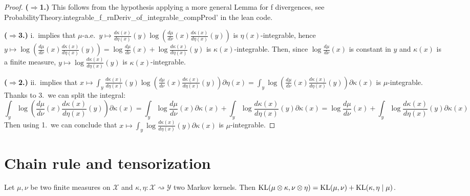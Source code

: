 \begin{proof}
{\bfseries($\Rightarrow$1.)} This follows from the hypothesis applying a more general Lemma for f divergences, see ProbabilityTheory.integrable\_f\_rnDeriv\_of\_integrable\_compProd' in the lean code.

{\bfseries($\Rightarrow$3.)} i.\ implies that $\mu$-a.e.\ $y \mapsto \frac{d \kappa(x)}{d \eta(x)}(y) \log \left(\frac{d \mu}{d \nu}(x) \frac{d \kappa(x)}{d \eta(x)}(y) \right)$ is $\eta(x)$-integrable, hence $y \mapsto \log \left(\frac{d \mu}{d \nu}(x) \frac{d \kappa(x)}{d \eta(x)}(y) \right) = \log \frac{d \mu}{d \nu}(x) + \log \frac{d \kappa(x)}{d \eta(x)}(y)$ is $\kappa(x)$-integrable. Then, since $\log \frac{d \mu}{d \nu}(x)$ is constant in $y$ and $\kappa(x)$ is a finite measure, $y \mapsto \log \frac{d \kappa(x)}{d \eta(x)}(y)$ is $\kappa(x)$-integrable.

{\bfseries($\Rightarrow$2.)} ii.\ implies that $x \mapsto  \int_y \frac{d \kappa(x)}{d \eta(x)}(y) \log \left(\frac{d \mu}{d \nu}(x) \frac{d \kappa(x)}{d \eta(x)}(y) \right) \partial \eta (x) = \int_y \log \left(\frac{d \mu}{d \nu}(x) \frac{d \kappa(x)}{d \eta(x)}(y) \right) \partial \kappa (x)$ is $\mu$-integrable. 
Thanks to 3.\ we can split the integral:
$$\int_y \log \left(\frac{d \mu}{d \nu}(x) \frac{d \kappa(x)}{d \eta(x)}(y) \right) \partial \kappa (x)
= \int_y \log \frac{d \mu}{d \nu}(x) \partial \kappa (x) + \int_y \log \frac{d \kappa(x)}{d \eta(x)}(y) \partial \kappa (x) = \log \frac{d \mu}{d \nu}(x) + \int_y \log \frac{d \kappa(x)}{d \eta(x)}(y) \partial \kappa (x)$$
Then using 1.\ we can conclude that $x \mapsto \int_y \log \frac{d \kappa(x)}{d \eta(x)}(y) \partial \kappa (x)$ is $\mu$-integrable.

\end{proof}



\section{Chain rule and tensorization}

\begin{theorem}
  \label{thm:kl_chain_rule}
  \leanok
  Let $\mu, \nu$ be two finite measures on $\mathcal X$ and $\kappa, \eta : \mathcal X \rightsquigarrow \mathcal Y$ two Markov kernels.
  Then $\operatorname{KL}(\mu \otimes \kappa, \nu \otimes \eta) = \operatorname{KL}(\mu, \nu) + \operatorname{KL}(\kappa, \eta \mid \mu)$.
\end{theorem}

